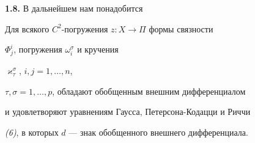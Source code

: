 {\bf 1.8.} В дальнейшем нам понадобится


\begin{thm}


Для всякого $C^2$-погружения $z: X\to \Pi$ формы связности


$\Phi^i_j$, погружения $\omega^{\sigma}_i$ и кручения


$\varkappa^{\sigma}_{\tau}$, $i,j= 1,\dotsc,n$,


$\tau,\sigma= 1,\dotsc,p$, обладают обобщенным внешним дифференциалом


и удовлетворяют уравнениям Гаусса, Петерсона-Кодацци и Риччи


{\em (6)}, в которых $d$ --- знак обобщенного внешнего дифференциала.


\end{thm}





